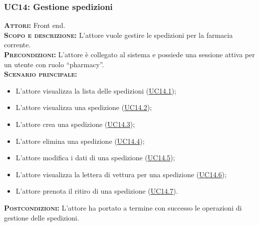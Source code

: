 \subsubsection{UC14: Gestione spedizioni}
\label{sec:UC14}
\textsc{\textbf{Attori:}} Front end.\\
\textsc{\textbf{Scopo e descrizione:}} L'attore vuole gestire le spedizioni per la farmacia corrente.\\
\textsc{\textsc{\textbf{Precondizioni:}}} L'attore è collegato al sistema e possiede una sessione attiva per un utente con ruolo ``pharmacy''.\\
\textsc{\textbf{Scenario principale:}}
\begin{itemize}
    \item L'attore visualizza la lista delle spedizioni (\hyperref[sec:UC141]{UC14.1});
    \item L'attore visualizza una spedizione (\hyperref[sec:UC142]{UC14.2});
    \item L'attore crea una spedizione (\hyperref[sec:UC143]{UC14.3});
    \item L'attore elimina una spedizione (\hyperref[sec:UC144]{UC14.4});
    \item L'attore modifica i dati di una spedizione (\hyperref[sec:UC145]{UC14.5});
    \item L'attore visualizza la lettera di vettura per una spedizione (\hyperref[sec:UC146]{UC14.6});
    \item L'attore prenota il ritiro di una spedizione (\hyperref[sec:UC147]{UC14.7}).
\end{itemize}
\textsc{\textbf{Postcondizioni:}} L'attore ha portato a termine con successo le operazioni di gestione delle spedizioni.

